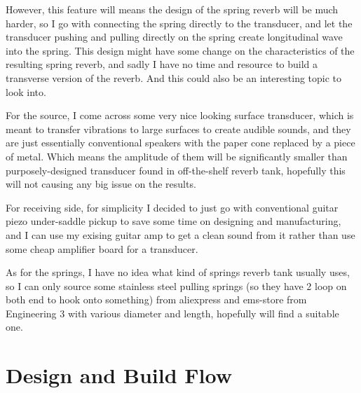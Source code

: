 \documentclass[11pt,a4paper]{article}
\begin{document}
However, this feature will means the design of the spring reverb will be much harder, so I go with connecting the spring directly to the transducer, and let the transducer pushing and pulling directly on the spring create longitudinal wave into the spring. This design might have some change on the characteristics of the resulting spring reverb, and sadly I have no time and resource to build a transverse version of the reverb. And this could also be an interesting topic to look into.

For the source, I come across some very nice looking surface transducer, which is meant to transfer vibrations to large surfaces to create audible sounds, and they are just essentially conventional speakers with the paper cone replaced by a piece of metal. Which means the amplitude of them will be significantly smaller than purposely-designed transducer found in off-the-shelf reverb tank, hopefully this will not causing any big issue on the results.

For receiving side, for simplicity I decided to just go with conventional guitar piezo under-saddle pickup to save some time on designing and manufacturing, and I can use my exising guitar amp to get a clean sound from it rather than use some cheap amplifier board for a transducer.

As for the springs, I have no idea what kind of springs reverb tank usually uses, so I can only source some stainless steel pulling springs (so they have 2 loop on both end to hook onto something) from aliexpress and ems-store from Engineering 3 with various diameter and length, hopefully will find a suitable one.

\newpage
\section{Design and Build Flow}
\end{document}
